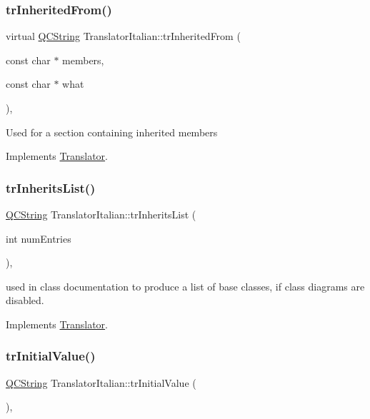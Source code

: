 \subsubsection{\texorpdfstring{trInheritedFrom()}{trInheritedFrom()}}
{\footnotesize\ttfamily virtual \mbox{\hyperlink{class_q_c_string}{Q\+C\+String}} Translator\+Italian\+::tr\+Inherited\+From (\begin{DoxyParamCaption}\item[{const char $\ast$}]{members,  }\item[{const char $\ast$}]{what }\end{DoxyParamCaption})\hspace{0.3cm}{\ttfamily [inline]}, {\ttfamily [virtual]}}

Used for a section containing inherited members 

Implements \mbox{\hyperlink{class_translator}{Translator}}.

\mbox{\label{class_translator_italian_a6f2cf9c525b59c4f1ed10501f41f60df}} 
\subsubsection{\texorpdfstring{trInheritsList()}{trInheritsList()}}
{\footnotesize\ttfamily \mbox{\hyperlink{class_q_c_string}{Q\+C\+String}} Translator\+Italian\+::tr\+Inherits\+List (\begin{DoxyParamCaption}\item[{int}]{num\+Entries }\end{DoxyParamCaption})\hspace{0.3cm}{\ttfamily [inline]}, {\ttfamily [virtual]}}

used in class documentation to produce a list of base classes, if class diagrams are disabled. 

Implements \mbox{\hyperlink{class_translator}{Translator}}.

\mbox{\label{class_translator_italian_abdebcdb0f7023e281da79c8e5aef347e}} 
\subsubsection{\texorpdfstring{trInitialValue()}{trInitialValue()}}
{\footnotesize\ttfamily \mbox{\hyperlink{class_q_c_string}{Q\+C\+String}} Translator\+Italian\+::tr\+Initial\+Value (\begin{DoxyParamCaption}{ }\end{DoxyParamCaption})\hspace{0.3cm}{\ttfamily [inline]}, {\ttfamily [virtual]}}

